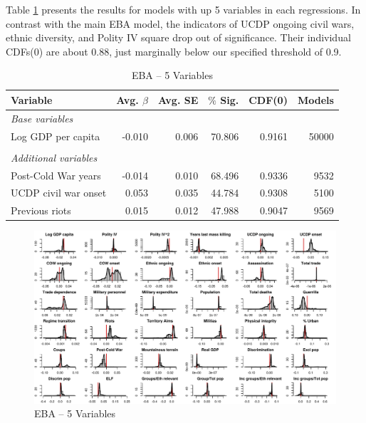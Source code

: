 Table \ref{tab:mk-5vars} presents the results for models with up 5 variables in each regressions. In contrast with the main EBA model, the indicators of UCDP ongoing civil wars, ethnic diversity, and Polity IV square drop out of significance. Their individual CDFs(0) are about 0.88, just marginally below our specified threshold of 0.9.

\vspace{1cm}

\begin{table}[!htpb]
\centering
\begin{tabular}{lrrrrr}
\hline
\textbf{Variable} & \textbf{Avg. $\beta$} & \textbf{Avg. SE} & \textbf{$\%$ Sig.} & \textbf{CDF(0)} & \textbf{Models} \\ \hline
\textit{Base variables} &  &  &  &  &  \\
Log GDP per capita & -0.010 & 0.006 & 70.806 & 0.9161 & 50000 \\
 &  &  &  &  &  \\
\textit{Additional variables} &  &  &  &  &  \\
Post-Cold War years & -0.014 & 0.010 & 68.496 & 0.9336 & 9532 \\
UCDP civil war onset & 0.053 & 0.035 & 44.784 & 0.9308 & 5100 \\
Previous riots & 0.015 & 0.012 & 47.988 & 0.9047 & 9569 \\\hline
\end{tabular}
\caption{EBA -- 5 Variables}
\label{tab:mk-5vars}
\end{table}

\clearpage
\begin{figure}
    \centering
    \includegraphics[width=\textwidth]{images/mk-5vars.pdf}
    \caption{EBA -- 5 Variables}
    \label{fig:mk-5vars}
\end{figure}
\clearpage

